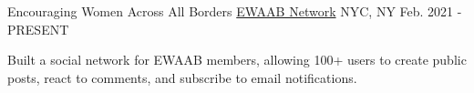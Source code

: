 \begin{cventries}
  \cventry
  {Encouraging Women Across All Borders} %
  {\href{https://ewaab.org}{EWAAB Network}} %
  {NYC, NY} %
  {Feb. 2021 - PRESENT} %
  {
    \begin{cvitems} %
      \item {Built a social network for EWAAB members, allowing 100+ users to create public posts, react to comments, and subscribe to email notifications.}
    \end{cvitems}
  }

\end{cventries}
